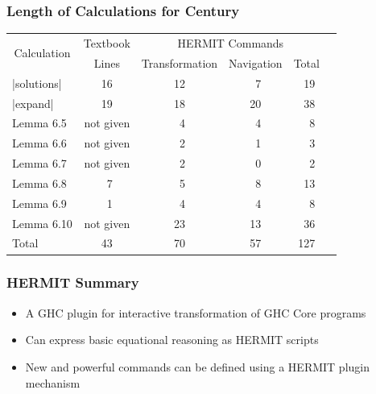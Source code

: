 \begin{frame}
\frametitle{Length of Calculations for Century}

\renewcommand{\tabcolsep}{1ex}

\begin{center}
\begin{tabular}{||l||c||c||c||c||c||}
\hline
\multicolumn{1}{||c||}{\multirow{2}{*}{Calculation}}
             &  Textbook        &  \multicolumn{3}{c||}{HERMIT Commands}\\
\cline{3-5}
             &  Lines           &  Transformation  &  Navigation  & Total \\
\hline
|solutions|  &  16              &  12              & ~7            & ~19 \\
|expand|     &  19              &  18              & 20           & ~38 \\
Lemma 6.5    &  not given       &  ~4               & ~4            & ~~8 \\
Lemma 6.6    &  not given       &  ~2               & ~1            & ~~3 \\
Lemma 6.7    &  not given       &  ~2               & ~0            & ~~2 \\
Lemma 6.8    &  ~7               &  ~5               & ~8            & ~13 \\
Lemma 6.9    &  ~1               &  ~4               & ~4            & ~~8 \\
Lemma 6.10   &  not given       &  23              & 13           & ~36 \\
Total        &  43              &  70              & 57           & 127 \\
\hline
\end{tabular}
\end{center}


\end{frame}

\begin{frame}
\frametitle{HERMIT Summary}

\begin{itemize}

\item
A GHC plugin for interactive transformation of GHC Core programs

\item
Can express basic equational reasoning as HERMIT scripts

\item
New and powerful commands can be defined using a HERMIT plugin mechanism

\end{itemize}


\end{frame}



